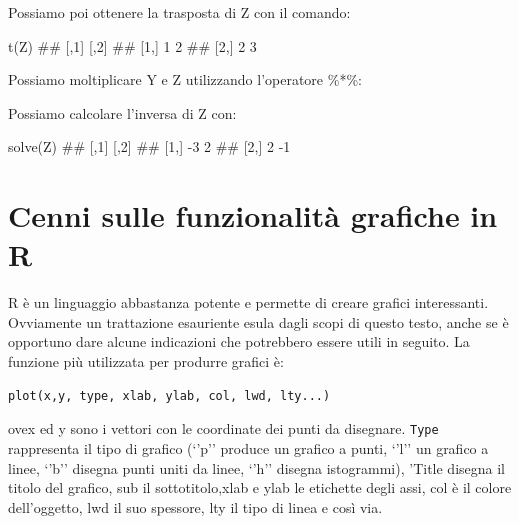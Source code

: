 \documentclass[a4paper,12pt,oneside]{book}
\newenvironment{Shaded}{}{}
\newcommand{\KeywordTok}[1]{#1}
\newcommand{\CommentTok}[1]{#1}
\newcommand{\OperatorTok}[1]{#1}
\newcommand{\NormalTok}[1]{#1}
\begin{document}
Possiamo poi ottenere la trasposta di Z con il comando:

\begin{Shaded}
\begin{Highlighting}[]
\KeywordTok{t}\NormalTok{(Z)}
\CommentTok{##      [,1] [,2]}
\CommentTok{## [1,]    1    2}
\CommentTok{## [2,]    2    3}
\end{Highlighting}
\end{Shaded}

Possiamo moltiplicare Y e Z utilizzando l'operatore \%*\%:

\begin{Shaded}
\end{Shaded}

Possiamo calcolare l'inversa di Z con:

\begin{Shaded}
\begin{Highlighting}[]
\KeywordTok{solve}\NormalTok{(Z)}
\CommentTok{##      [,1] [,2]}
\CommentTok{## [1,]   -3    2}
\CommentTok{## [2,]    2   -1}
\end{Highlighting}
\end{Shaded}

\hypertarget{cenni-sulle-funzionalita-grafiche-in-r}{%
\section*{Cenni sulle funzionalità grafiche in R}\label{cenni-sulle-funzionalita-grafiche-in-r}}

R è un linguaggio abbastanza potente e permette di creare grafici interessanti. Ovviamente un trattazione esauriente esula dagli scopi di questo testo, anche se è opportuno dare alcune indicazioni che potrebbero essere utili in seguito.
La funzione più utilizzata per produrre grafici è:

\begin{verbatim}
plot(x,y, type, xlab, ylab, col, lwd, lty...)
\end{verbatim}

ovex ed y sono i vettori con le coordinate dei punti da disegnare. \texttt{Type} rappresenta il tipo di grafico (`'p'' produce un grafico a punti, `'l'' un grafico a linee, `'b'' disegna punti uniti da linee, `'h'' disegna istogrammi), 'Title disegna il titolo del grafico, sub il sottotitolo,xlab e ylab le etichette degli assi, col è il colore dell'oggetto, lwd il suo spessore, lty il tipo di linea e così via.
\end{document}
